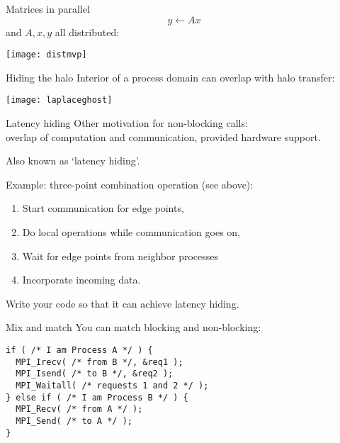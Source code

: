 \begin{numberedframe}{Matrices in parallel}
  \[ y\leftarrow Ax\]
  and $A,x,y$ all distributed:

  \texttt{[image: distmvp]}
\end{numberedframe}

\begin{numberedframe}{Hiding the halo}
  Interior of a process domain can overlap with halo transfer:

  \texttt{[image: laplaceghost]}
\end{numberedframe}

\begin{numberedframe}{Latency hiding}
  Other motivation for non-blocking calls:\\
  overlap of computation and communication, provided
  hardware support.

  Also known as `latency hiding'.

  Example: three-point combination operation (see above):
  \begin{enumerate}
  \item Start communication for edge points,
  \item Do local operations while communication goes on,
  \item Wait for edge points from neighbor processes
  \item Incorporate incoming data.
  \end{enumerate}
\end{numberedframe}

\begin{exerciseframe}[isendirecvarray]
  \label{ex:isendirecvarray}
  

  Write your code so that it can achieve latency hiding.
\end{exerciseframe}

\begin{numberedframe}{Mix and match}
  You can match blocking and non-blocking:
\begin{lstlisting}
if ( /* I am Process A */ ) {
  MPI_Irecv( /* from B */, &req1 );
  MPI_Isend( /* to B */, &req2 );
  MPI_Waitall( /* requests 1 and 2 */ );
} else if ( /* I am Process B */ ) {
  MPI_Recv( /* from A */ );
  MPI_Send( /* to A */ );
}
\end{lstlisting}
\end{numberedframe}

